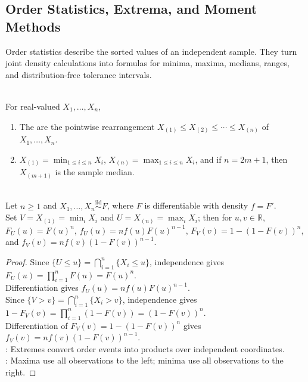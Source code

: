 \subsection{Order Statistics, Extrema, and Moment Methods}

Order statistics describe the sorted values of an independent sample. They turn joint density calculations into formulas for minima, maxima, medians, ranges, and distribution-free tolerance intervals.

\begin{definition} \label{def:order-statistics} \\
For real-valued $X_1,\ldots,X_n$,
\begin{enumerate}[label=(\roman*)]
\setlength{\itemsep}{0pt}
\item The  are the pointwise rearrangement $X_{(1)}\leq X_{(2)}\leq\cdots\leq X_{(n)}$ of $X_1,\ldots,X_n$.
\item $X_{(1)}=\min_{1\leq i\leq n}X_i$, $X_{(n)}=\max_{1\leq i\leq n}X_i$, and if $n=2m+1$, then $X_{(m+1)}$ is the sample median.
\end{enumerate}
\end{definition}

\begin{proposition} \label{prop:min-max-cdfs-and-densities} \\
Let $n\geq1$ and $X_1,\ldots,X_n\overset{\mathrm{iid}}{\sim}F$, where $F$ is differentiable with density $f=F'$.\\
Set $V=X_{(1)}=\min_iX_i$ and $U=X_{(n)}=\max_iX_i$; then for $u,v\in\mathbb{R}$, $F_U(u)=F(u)^n$, $f_U(u)=n f(u)F(u)^{n-1}$, $F_V(v)=1-(1-F(v))^n$, and $f_V(v)=n f(v)(1-F(v))^{n-1}$.
\begin{proof}
Since $\{U\leq u\}=\bigcap\limits_{i=1}^n\{X_i\leq u\}$, independence gives $F_U(u)=\prod\limits_{i=1}^nF(u)=F(u)^n$.\\
Differentiation gives $f_U(u)=n f(u)F(u)^{n-1}$.\\
Since $\{V>v\}=\bigcap\limits_{i=1}^n\{X_i>v\}$, independence gives $1-F_V(v)=\prod\limits_{i=1}^n(1-F(v))=(1-F(v))^n$.\\
Differentiation of $F_V(v)=1-(1-F(v))^n$ gives $f_V(v)=n f(v)(1-F(v))^{n-1}$.\\
: Extremes convert order events into products over independent coordinates.\\
: Maxima use all observations to the left; minima use all observations to the right.
\end{proof}
\end{proposition}

